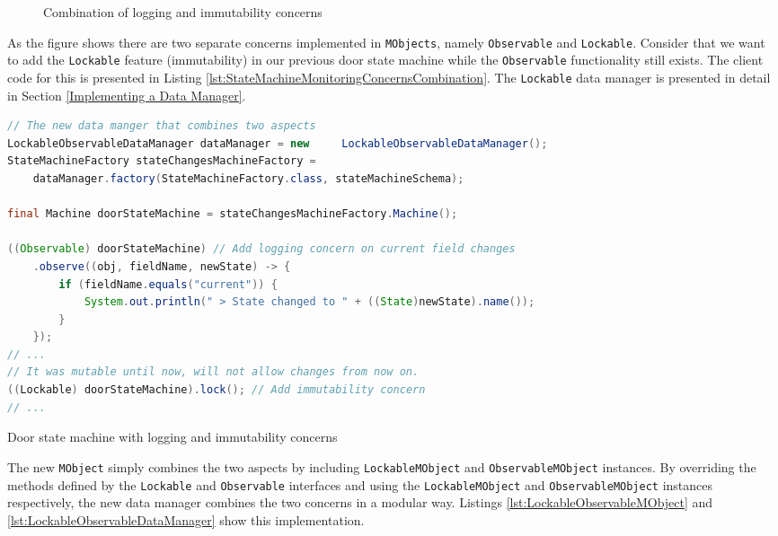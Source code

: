 \begin{figure}[H]
	\centering
  	\caption{Combination of logging and immutability concerns}
  	\label{fig:concerns_combination}
\end{figure}

As the figure shows there are two separate concerns implemented in \texttt{MObjects}, namely \texttt{Observable} and \texttt{Lockable}.
Consider that we want to add the \texttt{Lockable} feature (immutability) in our previous door state machine while the \texttt{Observable} functionality still exists.
The client code for this is presented in Listing \ref{lst:StateMachineMonitoringConcernsCombination}.
The \texttt{Lockable} data manager is presented in detail in Section \ref{Implementing a Data Manager}.

\begin{sourcecode} [H]
	\begin{lstlisting}[language=Java, escapechar=|]
// The new data manger that combines two aspects
LockableObservableDataManager dataManager = new 	LockableObservableDataManager();
StateMachineFactory stateChangesMachineFactory =
	dataManager.factory(StateMachineFactory.class, stateMachineSchema);

final Machine doorStateMachine = stateChangesMachineFactory.Machine();

((Observable) doorStateMachine) // Add logging concern on current field changes
	.observe((obj, fieldName, newState) -> {
		if (fieldName.equals("current")) {
			System.out.println(" > State changed to " + ((State)newState).name());
		}
	});
// ...
// It was mutable until now, will not allow changes from now on.
((Lockable) doorStateMachine).lock(); // Add immutability concern 
// ...
	\end{lstlisting}
	\caption{Door state machine with logging and immutability concerns}
	\label{lst:StateMachineMonitoringConcernsCombination}
\end{sourcecode}

The new \texttt{MObject} simply combines the two aspects by including \texttt{LockableMObject} and \texttt{ObservableMObject} instances.
By overriding the methods defined by the \texttt{Lockable} and \texttt{Observable} interfaces and using the \texttt{LockableMObject} and \texttt{ObservableMObject} instances respectively, the new data manager combines the two concerns in a modular way.
Listings \ref{lst:LockableObservableMObject} and \ref{lst:LockableObservableDataManager} show this implementation.

